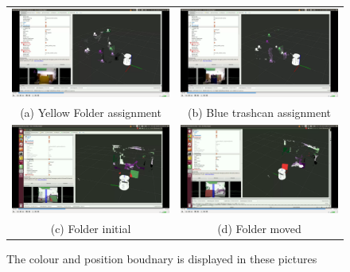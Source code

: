 \documentclass[twoside,hidelinks]{article}
\begin{document}
\begin{figure}
\begin{tabular}{cc}
  \includegraphics[width=.55\textwidth]{colorBound} &   \includegraphics[width=.55\textwidth]{colorBound2} \\
(a) Yellow Folder assignment  & (b) Blue trashcan assignment \\[6pt]
	\includegraphics[width=.55\textwidth]{posBound} &   \includegraphics[width=.55\textwidth]{posBound2} \\
(c) Folder initial  & (d) Folder moved \\[6pt]
\end{tabular}
\caption{The colour and position boudnary is displayed in these pictures}
  \label{pip:bounds}
\end{figure}
\end{document}
